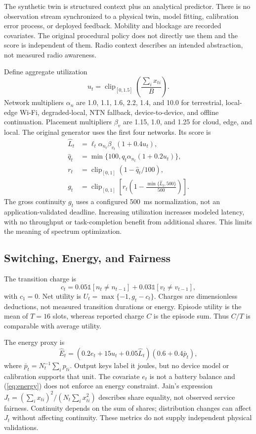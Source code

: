 \documentclass[letterpaper,journal]{IEEEtran}
\begin{document}
The synthetic twin is structured context plus an analytical predictor. There is no observation stream synchronized to a physical twin, model fitting, calibration error process, or deployed feedback. Mobility and blockage are recorded covariates. The original procedural policy does not directly use them and the score is independent of them. Radio context describes an intended abstraction, not measured radio awareness.

Define aggregate utilization
\begin{equation}u_t=\operatorname{clip}_{[0,1.5]}\left(\frac{\sum_i x_{ti}}{B}\right).\end{equation}
Network multipliers $\alpha_n$ are 1.0, 1.1, 1.6, 2.2, 1.4, and 10.0 for terrestrial, local-edge Wi-Fi, degraded-local, NTN fallback, device-to-device, and offline continuation. Placement multipliers $\beta_v$ are 1.15, 1.0, and 1.25 for cloud, edge, and local. The original generator uses the first four networks. Its score is
\begin{align}
\widehat L_t&=\ell_t\alpha_{n_t}\beta_{v_t}(1+0.4u_t),\label{eq:latency}\\
\widehat q_t&=\min\{100,q_t\alpha_{n_t}(1+0.2u_t)\},\\
r_t&=\operatorname{clip}_{[0,1]}(1-\widehat q_t/100),\\
g_t&=\operatorname{clip}_{[0,1]}\!\left[r_t\left(1-\frac{\min\{\widehat L_t,500\}}{500}\right)\right].\label{eq:gross}
\end{align}
The gross continuity $g_t$ uses a configured 500~ms normalization, not an application-validated deadline. Increasing utilization increases modeled latency, with no throughput or task-completion benefit from additional shares. This limits the meaning of spectrum optimization.

\subsection{Switching, Energy, and Fairness}
The transition charge is
\begin{equation}c_t=0.05\mathbb{1}[n_t\ne n_{t-1}]+0.03\mathbb{1}[v_t\ne v_{t-1}],\label{eq:cost}\end{equation}
with $c_1=0$. Net utility is $U_t=\max\{-1,g_t-c_t\}$. Charges are dimensionless deductions, not measured transition durations or energy. Episode utility is the mean of $T=16$ slots, whereas reported charge $C$ is the episode sum. Thus $C/T$ is comparable with average utility.

The energy proxy is
\begin{equation}\widehat E_t=(0.2e_t+15u_t+0.05\widehat L_t)(0.6+0.4\bar p_t),\label{eq:energy}\end{equation}
where $\bar p_t=N_t^{-1}\sum_i p_{ti}$. Output keys label it joules, but no device model or calibration supports that unit. The covariate $e_t$ is not a battery balance and (\ref{eq:energy}) does not enforce an energy constraint. Jain's expression $J_t=(\sum_i x_{ti})^2/(N_t\sum_i x_{ti}^2)$ describes share equality, not observed service fairness. Continuity depends on the sum of shares; distribution changes can affect $J_t$ without affecting continuity. These metrics do not supply independent physical validations.
\end{document}
